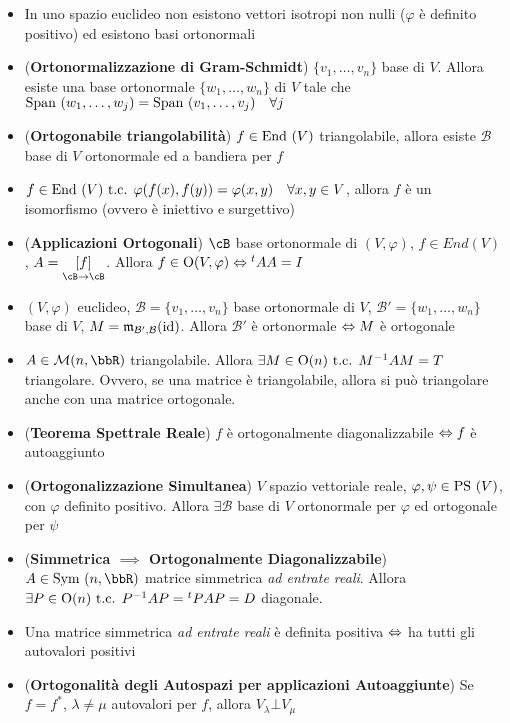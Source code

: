 \documentclass[a4paper,NoNotes,GeneralMath]{stdmdoc}
\newcommand{\mtrapp}[3]{\underset{ {{#2} \rar {#3}} }{ \left[ {#1} \right]}}
\begin{document}
	\begin{itemize}
		\item In uno spazio euclideo non esistono vettori isotropi non nulli ($\varphi$ è definito positivo) ed esistono basi ortonormali
		\item ({\bf Ortonormalizzazione di Gram-Schmidt}) $\{v_1, \ldots, v_n\}$ base di $V$. Allora esiste una base ortonormale $\{w_1, \ldots, w_n\}$ di $V$ tale che $\mbox{Span }(w_1, \ldots, w_j) = \mbox{Span }(v_1, \ldots, v_j) \quad \forall j$
		\item ({\bf Ortogonabile triangolabilità}) $f \in \mbox{End }(V)$ triangolabile, allora esiste $\mathcal{B}$ base di $V$ ortonormale ed a bandiera per $f$
		\item $f \in \mbox{End }(V) \mbox{ t.c. } \varphi(f(x), f(y)) = \varphi(x, y) \quad \forall x, y \in V$, allora $f$ è un isomorfismo (ovvero è iniettivo e surgettivo)
		\item ({\bf Applicazioni Ortogonali}) $\cB$ base ortonormale di $(V, \varphi)$, $f \in End(V)$, $A = \mtrapp{f}{\cB}{\cB}$. Allora $f \in \mbox{O}(V, \varphi) \Leftrightarrow {}^tA A = I$
		\item $(V, \varphi)$ euclideo, $\mathcal{B} = \{v_1, \ldots, v_n\}$ base ortonormale di $V$, $\mathcal{B'} = \{w_1, \ldots, w_n\}$ base di $V$, $M = \mathfrak{m}_{\mathcal{B'}, \mathcal{B}}(\mbox{id})$. Allora $\mathcal{B'}$ è ortonormale $\Leftrightarrow M$ è ortogonale
		\item $A \in \mathcal{M}(n,\bbR)$ triangolabile. Allora $\exists M \in \mbox{O}(n) \mbox{ t.c. } M^{-1}AM = T$ triangolare. Ovvero, se una matrice è triangolabile, allora si può triangolare anche con una matrice ortogonale.
		\item ({\bf Teorema Spettrale Reale}) $f$ è ortogonalmente diagonalizzabile $\Leftrightarrow f$ è autoaggiunto
		\item ({\bf Ortogonalizzazione Simultanea}) $V$ spazio vettoriale reale, $\varphi, \psi \in \mbox{PS }(V)$, con $\varphi$ definito positivo. Allora $\exists \mathcal{B}$ base di $V$ ortonormale per $\varphi$ ed ortogonale per $\psi$
		\item ({\bf Simmetrica $\implies$ Ortogonalmente Diagonalizzabile}) $A \in \Symm(n, \bbR)$ matrice simmetrica {\it ad entrate reali}. Allora $\exists P \in \mbox{O}(n) \mbox{ t.c. } P^{-1}AP = {}^tPAP = D$ diagonale.
		\item Una matrice simmetrica {\it ad entrate reali} è definita positiva $\Leftrightarrow$ ha tutti gli autovalori positivi
		\item ({\bf Ortogonalità degli Autospazi per applicazioni Autoaggiunte}) Se $f = f^{*}$, $\lambda \neq \mu$ autovalori per $f$, allora $V_\lambda \bot V_\mu$

\end{itemize}
\end{document}
